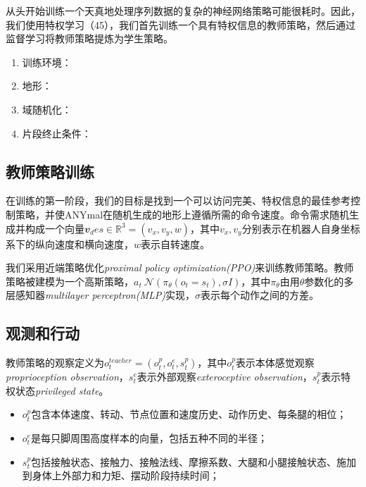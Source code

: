 从头开始训练一个天真地处理序列数据的复杂的神经网络策略可能很耗时\cite[p]{Lee_Hwangbo_Wellhausen_Koltun_Hutter_2020}。因此，我们使用特权学习（45），我们首先训练一个具有特权信息的教师策略，然后通过监督学习将教师策略提炼为学生策略\cite[p]{Chen_Zhou_Koltun_Krähenbühl_2019}。

\begin{enumerate}
  \item 训练环境：
  \item 地形：
  \item 域随机化：
  \item 片段终止条件：
\end{enumerate}

\subsection[教师策略训练]{教师策略训练}

在训练的第一阶段，我们的目标是找到一个可以访问完美、特权信息的最佳参考控制策略，并使ANYmal在随机生成的地形上遵循所需的命令速度。命令需求随机生成并构成一个向量$\mathbfit{v}_des\in \mathbb{R}^3=(v_x,v_y,w)$，其中$v_x, v_y$分别表示在机器人自身坐标系下的纵向速度和横向速度，$w$表示自转速度。

我们采用近端策略优化\emph{proximal policy optimization(PPO)}\cite[p]{Schulman_Wolski_Dhariwal_Radford_Klimov_2017}来训练教师策略。教师策略被建模为一个高斯策略，$a_t~\mathcal{N}(\pi_{\theta}(o_t=s_t),\sigma I)$，其中$\pi_{\theta}$由用$\theta$参数化的多层感知器\emph{multilayer perceptron(MLP)}实现，$\sigma$表示每个动作之间的方差。

\subsection[观测和行动]{观测和行动}

教师策略的观察定义为$o_t^{teacher}=(o_t^p, o_t^e, s_t^p)$，其中$o_t^p$表示本体感觉观察\emph{proprioception observation}，$s_t^e$表示外部观察\emph{exteroceptive observation}，$s_t^p$表示特权状态\emph{privileged state}。
\begin{itemize}
  \item $o_t^p$包含本体速度、转动、节点位置和速度历史、动作历史、每条腿的相位；
  \item $o_t^e$是每只脚周围高度样本的向量，包括五种不同的半径；
  \item $s_t^p$包括接触状态、接触力、接触法线、摩擦系数、大腿和小腿接触状态、施加到身体上外部力和力矩、摆动阶段持续时间；
\end{itemize}

